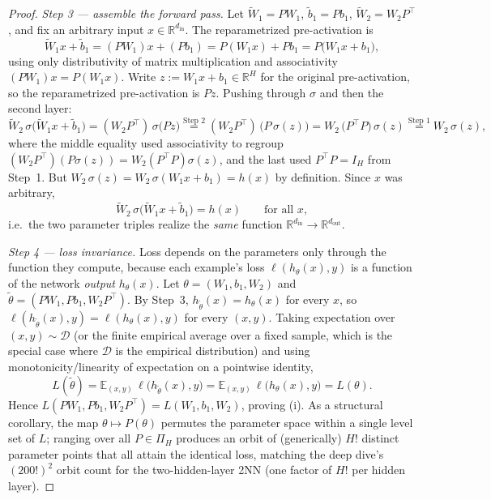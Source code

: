 \documentclass[11pt]{article}
\theoremstyle{definition}
\theoremstyle{remark}
\begin{document}
\begin{proof}
\emph{Step 3 --- assemble the forward pass.}
Let $\widetilde W_1=PW_1$, $\widetilde b_1=Pb_1$, $\widetilde W_2=W_2P^{\top}$, and fix an arbitrary
input $x\in\mathbb{R}^{d_{\mathrm{in}}}$. The reparametrized pre-activation is
\[
\widetilde W_1 x + \widetilde b_1 = (PW_1)x + (Pb_1) = P(W_1 x) + P b_1 = P\bigl(W_1 x + b_1\bigr),
\]
using only distributivity of matrix multiplication and associativity $(PW_1)x=P(W_1x)$. Write
$z:=W_1 x + b_1\in\mathbb{R}^H$ for the original pre-activation, so the reparametrized
pre-activation is $Pz$. Pushing through $\sigma$ and then the second layer:
\[
\widetilde W_2\,\sigma\bigl(\widetilde W_1 x + \widetilde b_1\bigr)
= (W_2 P^{\top})\,\sigma\bigl(P z\bigr)
\overset{\text{Step 2}}{=} (W_2 P^{\top})\,\bigl(P\,\sigma(z)\bigr)
= W_2\,\bigl(P^{\top}P\bigr)\,\sigma(z)
\overset{\text{Step 1}}{=} W_2\,\sigma(z),
\]
where the middle equality used associativity to regroup $(W_2P^{\top})(P\sigma(z))=W_2(P^{\top}P)\sigma(z)$,
and the last used $P^{\top}P=I_H$ from Step~1. But $W_2\,\sigma(z)=W_2\,\sigma(W_1x+b_1)=h(x)$ by
definition. Since $x$ was arbitrary,
\[
\widetilde W_2\,\sigma\bigl(\widetilde W_1 x + \widetilde b_1\bigr)=h(x)\qquad\text{for all }x,
\]
i.e.\ the two parameter triples realize the \emph{same} function $\mathbb{R}^{d_{\mathrm{in}}}\to
\mathbb{R}^{d_{\mathrm{out}}}$.

\emph{Step 4 --- loss invariance.}
Loss depends on the parameters only through the function they compute, because each example's loss
$\ell(h_\theta(x),y)$ is a function of the network \emph{output} $h_\theta(x)$. Let
$\theta=(W_1,b_1,W_2)$ and $\widetilde\theta=(PW_1,Pb_1,W_2P^{\top})$. By Step~3,
$h_{\widetilde\theta}(x)=h_\theta(x)$ for every $x$, so $\ell(h_{\widetilde\theta}(x),y)=
\ell(h_\theta(x),y)$ for every $(x,y)$. Taking expectation over $(x,y)\sim\mathcal D$ (or the finite
empirical average over a fixed sample, which is the special case where $\mathcal D$ is the empirical
distribution) and using monotonicity/linearity of expectation on a pointwise identity,
\[
L(\widetilde\theta)=\mathbb{E}_{(x,y)}\,\ell\bigl(h_{\widetilde\theta}(x),y\bigr)
=\mathbb{E}_{(x,y)}\,\ell\bigl(h_{\theta}(x),y\bigr)=L(\theta).
\]
Hence $L(PW_1,Pb_1,W_2P^{\top})=L(W_1,b_1,W_2)$, proving (i). As a structural corollary, the map
$\theta\mapsto P(\theta)$ permutes the parameter space within a single level set of $L$; ranging over
all $P\in\Pi_H$ produces an orbit of (generically) $H!$ distinct parameter points that all attain the
identical loss, matching the deep dive's $(200!)^2$ orbit count for the two-hidden-layer 2NN
(one factor of $H!$ per hidden layer).


\end{proof}
\end{document}
